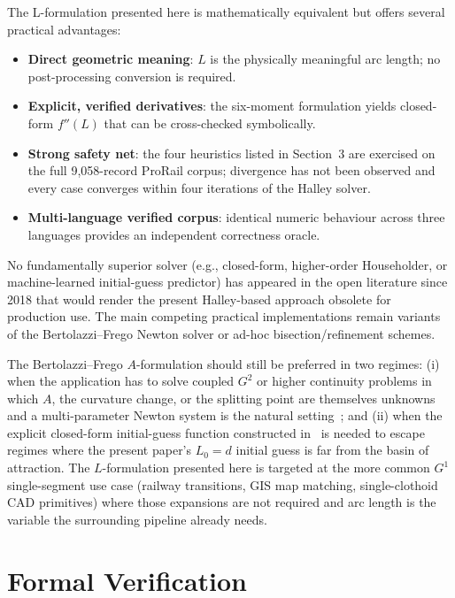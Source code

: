 \documentclass[11pt,a4paper]{article}
\begin{document}
The L-formulation presented here is mathematically equivalent but offers several practical advantages:
\begin{itemize}
    \item \textbf{Direct geometric meaning}: $L$ is the physically meaningful arc length; no post-processing conversion is required.
    \item \textbf{Explicit, verified derivatives}: the six-moment formulation yields closed-form $f''(L)$ that can be cross-checked symbolically.
    \item \textbf{Strong safety net}: the four heuristics listed in Section~3 are exercised on the full 9{,}058-record ProRail corpus; divergence has not been observed and every case converges within four iterations of the Halley solver.
    \item \textbf{Multi-language verified corpus}: identical numeric behaviour across three languages provides an independent correctness oracle.
\end{itemize}

No fundamentally superior solver (e.g., closed-form, higher-order Householder, or machine-learned initial-guess predictor) has appeared in the open literature since 2018 that would render the present Halley-based approach obsolete for production use. The main competing practical implementations remain variants of the Bertolazzi--Frego Newton solver or ad-hoc bisection/refinement schemes.

The Bertolazzi--Frego $A$-formulation should still be preferred in two regimes: (i) when the application has to solve coupled $G^2$ or higher continuity problems in which $A$, the curvature change, or the splitting point are themselves unknowns and a multi-parameter Newton system is the natural setting~\citep{Bertolazzi2018}; and (ii) when the explicit closed-form initial-guess function constructed in~\citep{Bertolazzi2013arxiv} is needed to escape regimes where the present paper's $L_0 = d$ initial guess is far from the basin of attraction. The $L$-formulation presented here is targeted at the more common $G^1$ single-segment use case (railway transitions, GIS map matching, single-clothoid CAD primitives) where those expansions are not required and arc length is the variable the surrounding pipeline already needs.

\section{Formal Verification}
\label{sec:verification}
\end{document}
